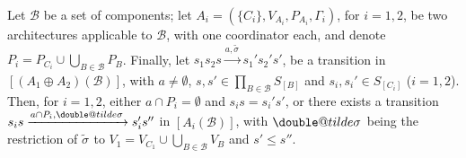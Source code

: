 \documentclass{llncs}
\makeatletter
\newcommand{\cB}{\ensuremath{\mathcal{B}}}
\newcommand{\goesto}[2][]{\ensuremath{\xrightarrow[#1]{#2}}}
\newcommand{\val}[3][]{\ensuremath{#1{\sigma}^{#2}_{#3}}}
\newcommand{\semopen}[1]{\ensuremath{[{#1}]}}
\newcommand{\arcomp}{\oplus}
\newcommand{\order}{\leqslant}
\newcommand{\doubletilde}[1]{{%
  \mathpalette\double@tilde{#1}%
}}
\newcommand{\double@tilde}[2]{%
  \sbox\z@{$\m@th#1\tilde{#2}$}%
  \ht\z@=.9\ht\z@
  \tilde{\box\z@}%
}
\makeatother
\begin{document}
\begin{lemma}
  \label{lem:onestep}
  Let $\cB$ be a set of components; let $A_i = (\{C_i\}, V_{A_i},
  P_{A_i}, \Gamma_i)$, for $i = 1,2$, be two architectures
  applicable to $\cB$, with one coordinator each, and denote
  $P_i = P_{C_i} \cup \bigcup_{B \in \cB} P_B$.
  Finally, let
%
  $
  s_1 s_2 s
%
  \goesto{a, \tilde{\val{}{}}}
%
  s_1' s_2' s'
  $,
%
  be a transition in $\semopen{(A_1 \arcomp A_2)(\cB)}$, with
  $a \neq \emptyset$, 
  $s, s' \in \prod_{B \in \cB} S_{\semopen{B}}$
  and
  $s_i, s_i' \in S_{\semopen{C_i}}$ ($i=1,2$).
%
  Then, for $i=1,2$, either $a \cap P_i = \emptyset$ and $s_i s=
  s_i' s'$, or there exists a transition
%
  $
  s_i s
%
  \goesto{a \cap P_i, \val[\doubletilde]{}{}}
%
  s_i' s''
  $ 
%
  in $\semopen{A_i(\cB)}$, with
  $\val[\doubletilde]{}{}$ being the restriction of
  $\val[\tilde]{}{}$ to
  $V_1 = V_{C_1} \cup \bigcup_{B \in \cB} V_B$ and
  $s' \order s''$.
\end{lemma}
%
\end{document}
